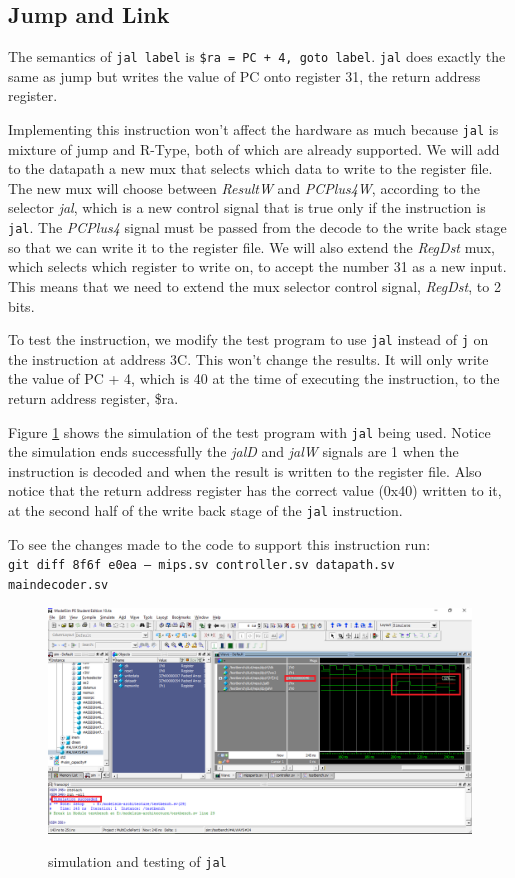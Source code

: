 \documentclass[titlepage,12pt,twoside,a4paper]{article}
\newcommand{\code}[1]{{\texttt{#1}}}
\begin{document}
\subsection{Jump and Link}
The semantics of \code{jal label} is \code{\$ra = PC + 4, goto label}. \code{jal} does exactly the same as jump but writes the value of PC onto register 31, the return address register.

Implementing this instruction won't affect the hardware as much because \code{jal} is mixture of jump and R-Type, both of which are already supported. We will add to the datapath a new mux that selects which data to write to the register file. The new mux will choose between \textit{ResultW} and \textit{PCPlus4W}, according to the selector \textit{jal}, which is a new control signal that is true only if the instruction is \code{jal}. The \textit{PCPlus4} signal must be passed from the decode to the write back stage so that we can write it to the register file. We will also extend the \textit{RegDst} mux, which selects which register to write on, to accept the number 31 as a new input. This means that we need to extend the mux selector control signal, \textit{RegDst}, to 2 bits.

To test the instruction, we modify the test program to use \code{jal} instead of \code{j} on the instruction at address 3C. This won't change the results. It will only write the value of PC + 4, which is 40 at the time of executing the instruction, to the return address register, \$ra.

Figure \ref{jaltest} shows the simulation of the test program with \code{jal} being used. Notice the simulation ends successfully the \textit{jalD} and \textit{jalW} signals are 1 when the instruction is decoded and when the result is written to the register file. Also notice that the return address register has the correct value (0x40) written to it, at the second half of the write back stage of the \code{jal} instruction.

To see the changes made to the code to support this instruction run: \\
\code{git diff 8f6f e0ea -- mips.sv controller.sv datapath.sv \\ maindecoder.sv}

\begin{figure}
	\includegraphics[width=\textwidth]{jaltest.png}
	\centering
	\label{jaltest}
	\caption{simulation and testing of \code{jal}}
\end{figure}
\end{document}
